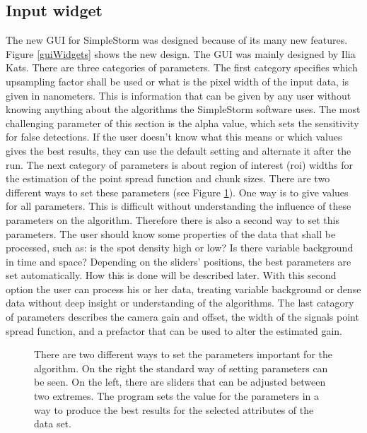 \subsection{Input widget}
The new GUI for SimpleStorm was designed because of its many new features. Figure \ref{guiWidgets} shows the new design. The GUI was mainly designed by Ilia Kats.
There are three categories of parameters. The first category specifies which upsampling factor shall be used or what is the pixel width of the input data, is given in nanometers. This is information that can be given by any user without knowing anything about the algorithms  the SimpleStorm software uses. The most challenging parameter of this section is the alpha value, which sets the sensitivity for false detections. If the user doesn't know what this means or which values gives the best results, they can use the default setting and alternate it after the run. \newline
The next category of parameters is about region of interest (roi) widths for the estimation of the point spread function and chunk sizes. There are two different ways to set these parameters (see Figure \ref{guiSettings}). One way is to give values for all parameters. This is difficult without understanding the influence of these parameters on the algorithm. Therefore there is also a second way to set this parameters. The user should know some properties of the data that shall be processed, such as: is the spot density high or low? Is there variable background in time and space? Depending on the sliders' positions, the best parameters are set automatically. How this is done will be described later. With this second option the user can process his or her data, treating variable background or dense data without deep insight or understanding of the algorithms.\newline
The last catagory of parameters describes the camera gain and offset, the width of the signals point spread function, and a prefactor that can be used to alter the estimated gain. 
\begin{figure}
\hfill
	\caption{There are two different ways to set the parameters important for the algorithm. On the right the standard way of setting parameters can be seen. On the left, there are sliders that can be adjusted between two extremes. The program sets the value for the parameters in a way to produce the best results for the selected attributes of the data set.}
	\label{guiSettings}	
\end{figure}
